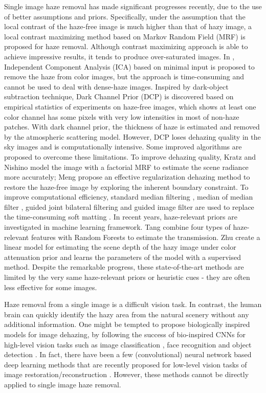 \documentclass[journal]{IEEEtran}
\begin{document}
Single image haze removal has made significant progresses recently, due to the use of better assumptions and priors. Specifically, under the assumption that the local contrast of the haze-free image is much higher than that of hazy image, a local contrast maximizing method \cite{maxcontrast} based on Markov Random Field (MRF) is proposed for haze removal. Although contrast maximizing approach is able to achieve impressive results, it tends to produce over-saturated images. In \cite{ica}, Independent Component Analysis (ICA) based on minimal input is proposed to remove the haze from color images, but the approach is time-consuming and cannot be used to deal with dense-haze images. Inspired by dark-object subtraction technique, Dark Channel Prior (DCP) \cite{dcp} is discovered based on empirical statistics of experiments on haze-free images, which shows at least one color channel has some pixels with very low intensities in most of non-haze patches. With dark channel prior, the thickness of haze is estimated and removed by the atmospheric scattering model. However, DCP loses dehazing quality in the sky images and is computationally intensive. Some improved algorithms are proposed to overcome these limitations. To improve dehazing quality, Kratz and Nishino \etal \cite{bayesian} model the image with a factorial MRF to estimate the scene radiance more accurately; Meng \etal \cite{bccr} propose an effective regularization dehazing method to restore the haze-free image by exploring the inherent boundary constraint. To improve computational efficiency, standard median filtering \cite{median}, median of median filter \cite{medianmedian}, guided joint bilateral filtering \cite{jointbilateral} and guided image filter \cite{guided} are used to replace the time-consuming soft matting \cite{softmatting}. In recent years, haze-relevant priors are investigated in machine learning framework. Tang \etal \cite{rf} combine four types of haze-relevant features with Random Forests to estimate the transmission. Zhu \etal \cite{cap} create a linear model for estimating the scene depth of the hazy image under color attenuation prior and learns the parameters of the model with a supervised method. Despite the remarkable progress, these state-of-the-art methods are limited by the very same haze-relevant priors or heuristic cues - they are often less effective for some images.

Haze removal from a single image is a difficult vision task. In contrast, the human brain can quickly identify the hazy area from the natural scenery without any additional information. One might be tempted to propose biologically inspired models for image dehazing, by following the success of bio-inspired CNNs for high-level vision tasks such as image classification \cite{imagenet}, face recognition \cite{facednn} and object detection \cite{objectdetection}. In fact, there have been a few (convolutional) neural network based deep learning methods that are recently proposed for low-level vision tasks of image restoration/reconstruction \cite{deconvolution,srcnn,dirtrain}. However, these methods cannot be directly applied to single image haze removal.
\end{document}

